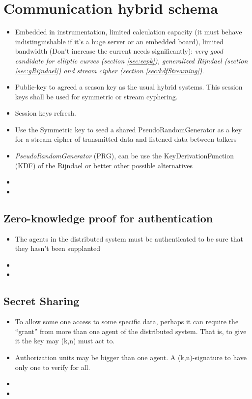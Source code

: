 \documentclass[10pt,a4paper,twoside]{llncs}
\begin{document}
%
\section{Communication hybrid schema \label{sec:intercom}}

\begin{itemize}
 \item Embedded in instrumentation, limited calculation capacity (it must behave indistinguishable if it's a huge server or an embedded board), limited bandwidth (Don't increase the current needs significantly): \emph{very good candidate for elliptic curves (section \ref{sec:ecpk}), generalized Rijndael (section \ref{sec:gRijndael}) and stream cipher (section \ref{sec:kdfStreaming})}.
 \item Public-key to agreed a season key as the usual hybrid systems. This session keys shall be used for symmetric or stream cyphering.
 \item Session keys refresh.
 \item Use the Symmetric key to seed a shared PseudoRandomGenerator as a key for a stream cipher of transmitted data and listened data between talkers
 \item \emph{PseudoRandomGenerator} (PRG), can be use the KeyDerivationFunction (KDF) of the Rijndael or better other possible alternatives
 \item 
 \item 
\end{itemize}

%
\subsection{Zero-knowledge proof for authentication \label{sec:auth}}
\begin{itemize}
 \item The agents in the distributed system must be authenticated to be sure that they hasn't been supplanted
 \item 
 \item 
\end{itemize}

%
\subsection{Secret Sharing \label{sec:secretSharing}}
\begin{itemize}
 \item To allow some one access to some specific data, perhaps it can require the ``grant'' from more than one agent of the distributed system. That is, to give it the key may (k,n) must act to.
 \item Authorization units may be bigger than one agent. A (k,n)-signature to have only one to verify for all.
 \item
 \item
\end{itemize}
\end{document}
